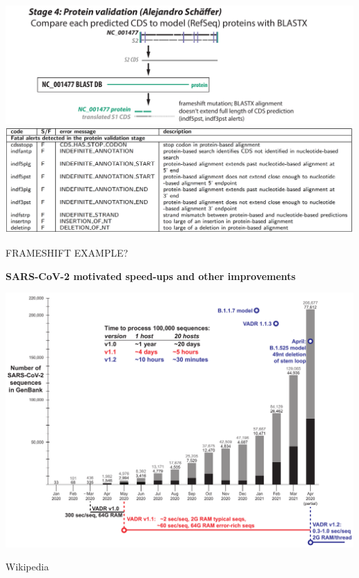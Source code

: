 \documentclass[landscape]{slides}
\begin{document}
\begin{slide}
\begin{center}

\includegraphics[width=10.5in]{figs/v-annotate-stage4-2}
\includegraphics[width=10.5in]{figs/ss-protein-alert-list}

\end{center}
\vfill
\end{slide}
\begin{slide}
\begin{center}

FRAMESHIFT EXAMPLE?

\end{center}
\vfill
\end{slide}
\begin{slide}
\begin{center}
\large{\textbf{SARS-CoV-2 motivated speed-ups and other improvements}}

\includegraphics[width=10.25in]{figs/sars-counts-jan2020-apr2021-slide6}

\end{center}

\vfill
\end{slide}
\begin{slide}
\begin{center}

Wikipedia

\end{center}
\vfill
\end{slide}
\end{document}
